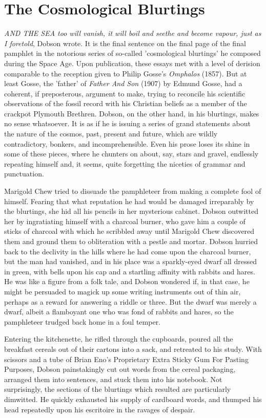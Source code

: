\chapter{The Cosmological Blurtings}

\emph{AND THE SEA too will vanish, it will boil and seethe and become vapour, just as I foretold}, Dobson wrote. It is the final sentence on the final page of the final pamphlet in the notorious series of so-called 'cosmological blurtings' he composed during the Space Age. Upon publication, these essays met with a level of derision comparable to the reception given to Philip Gosse's \emph{Omphalos} (1857). But at least Gosse, the 'father' of \emph{Father And Son} (1907) by Edmund Gosse, had a coherent, if preposterous, argument to make, trying to reconcile his scientific observations of the fossil record with his Christian beliefs as a member of the crackpot Plymouth Brethren. Dobson, on the other hand, in his blurtings, makes no sense whatsoever. It is as if he is issuing a series of grand statements about the nature of the cosmos, past, present and future, which are wildly contradictory, bonkers, and incomprehensible. Even his prose loses its shine in some of these pieces, where he chunters on about, say, stars and gravel, endlessly repeating himself and, it seems, quite forgetting the niceties of grammar and punctuation.

Marigold Chew tried to dissuade the pamphleteer from making a complete fool of himself. Fearing that what reputation he had would be damaged irreparably by the blurtings, she hid all his pencils in her mysterious cabinet. Dobson outwitted her by ingratiating himself with a charcoal burner, who gave him a couple of sticks of charcoal with which he scribbled away until Marigold Chew discovered them and ground them to obliteration with a pestle and mortar. Dobson hurried back to the declivity in the hills where he had come upon the charcoal burner, but the man had vanished, and in his place was a sparkly-eyed dwarf all dressed in green, with bells upon his cap and a startling affinity with rabbits and hares. He was like a figure from a folk tale, and Dobson wondered if, in that case, he might be persuaded to magick up some writing instruments out of thin air, perhaps as a reward for answering a riddle or three. But the dwarf was merely a dwarf, albeit a flamboyant one who was fond of rabbits and hares, so the pamphleteer trudged back home in a foul temper.

Entering the kitchenette, he rifled through the cupboards, poured all the breakfast cereals out of their cartons into a sack, and retreated to his study. With scissors and a tube of Brian Eno's Proprietary Extra Sticky Gum For Pasting Purposes, Dobson painstakingly cut out words from the cereal packaging, arranged them into sentences, and stuck them into his notebook. Not surprisingly, the sections of the blurtings which resulted are particularly dimwitted. He quickly exhausted his supply of cardboard words, and thumped his head repeatedly upon his escritoire in the ravages of despair.

